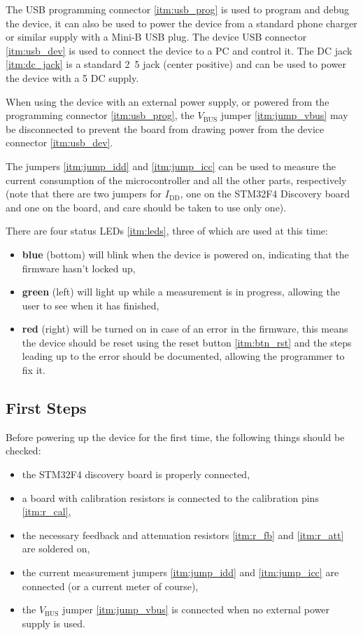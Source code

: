 The USB programming connector \ref{itm:usb_prog} is used to program and debug the device, it can also be used to power
the device from a standard phone charger or similar supply with a Mini-B USB plug.
The device USB connector \ref{itm:usb_dev} is used to connect the device to a PC and control it.
The DC jack \ref{itm:dc_jack} is a standard \unit{2.5}{\milli\meter} jack (center positive) and can be used to
power the device with a \unit{5}{\volt} DC supply.

When using the device with an external power supply, or powered from the programming connector \ref{itm:usb_prog},
the $ V_\text{BUS} $ jumper \ref{itm:jump_vbus} may be disconnected to prevent the board from drawing power from the
device connector \ref{itm:usb_dev}.

The jumpers \ref{itm:jump_idd} and \ref{itm:jump_icc} can be used to measure the current consumption of the
microcontroller and all the other parts, respectively (note that there are two jumpers for $ I_\text{DD} $,
one on the STM32F4 Discovery board and one on the board, and care should be taken to use only one).

There are four status LEDs \ref{itm:leds}, three of which are used at this time:
\begin{itemize}
	\item \textbf{\color{blue} blue} (bottom) will blink when the device is powered on, indicating that the firmware
    hasn't locked up,
  \item \textbf{\color{OliveGreen} green} (left) will light up while a measurement is in progress, allowing the user
    to see when it has finished,
  \item \textbf{\color{red} red} (right) will be turned on in case of an error in the firmware, this means the device
    should be reset using the reset button \ref{itm:btn_rst} and the steps leading up to the error should be
    documented, allowing the programmer to fix it.
\end{itemize}

\subsection{First Steps}

Before powering up the device for the first time, the following things should be checked:
\begin{itemize}
	\item the STM32F4 discovery board is properly connected,
  \item a board with calibration resistors is connected to the calibration pins \ref{itm:r_cal},
  \item the necessary feedback and attenuation resistors \ref{itm:r_fb} and \ref{itm:r_att} are soldered on,
  \item the current measurement jumpers \ref{itm:jump_idd} and \ref{itm:jump_icc} are connected
    (or a current meter of course),
  \item the $ V_\text{BUS} $ jumper \ref{itm:jump_vbus} is connected when no external power supply is used.
\end{itemize}

